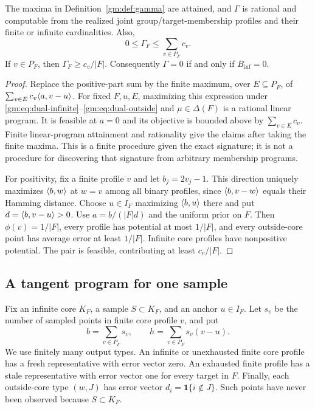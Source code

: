 \begin{lemma}\label{gm:lem:coefficient}
The maxima in Definition~\ref{gm:def:gamma} are attained, and $\Gamma$ is rational and computable from the realized joint group/target-membership profiles and their finite or infinite cardinalities. Also,
\[
0\le\Gamma_F\le\sum_{v\in P_F}c_v.
\]
If $v\in P_F$, then $\Gamma_F\ge c_v/|F|$. Consequently $\Gamma=0$ if and only if $B_{\mathrm{inf}}=0$.
\end{lemma}
\begin{proof}
Replace the positive-part sum by the finite maximum, over $E\subseteq P_F$, of
$\sum_{v\in E}c_v\langle a,v-u\rangle$.
For fixed $F,u,E$, maximizing this expression under \eqref{gm:eq:dual-infinite}--\eqref{gm:eq:dual-outside} and $\mu\in\Delta(F)$ is a rational linear program. It is feasible at $a=0$ and its objective is bounded above by $\sum_{v\in E}c_v$. Finite linear-program attainment and rationality give the claims after taking the finite maxima. This is a finite procedure given the exact signature; it is not a procedure for discovering that signature from arbitrary membership programs.

For positivity, fix a finite profile $v$ and let $b_j=2v_j-1$. This direction uniquely maximizes $\langle b,w\rangle$ at $w=v$ among all binary profiles, since
$\langle b,v-w\rangle$ equals their Hamming distance. Choose $u\in I_F$ maximizing $\langle b,u\rangle$ there and put $d=\langle b,v-u\rangle>0$. Use $a=b/(|F|d)$ and the uniform prior on $F$. Then $\phi(v)=1/|F|$, every profile has potential at most $1/|F|$, and every outside-core point has average error at least $1/|F|$. Infinite core profiles have nonpositive potential. The pair is feasible, contributing at least $c_v/|F|$.
\end{proof}

\subsection{A tangent program for one sample}\label{gm:sec:tangent}
Fix an infinite core $K_F$, a sample $S\subset K_F$, and an anchor $u\in I_F$. Let $s_v$ be the number of sampled points in finite core profile $v$, and put
\[
b=\sum_{v\in P_F}s_v,\qquad
h=\sum_{v\in P_F}s_v(v-u).
\]
We use finitely many output types. An infinite or unexhausted finite core profile has a fresh representative with error vector zero. An exhausted finite profile has a stale representative with error vector one for every target in $F$. Finally, each outside-core type $(w,J)$ has error vector $d_i=\mathbf 1\{i\notin J\}$. Such points have never been observed because $S\subset K_F$.

